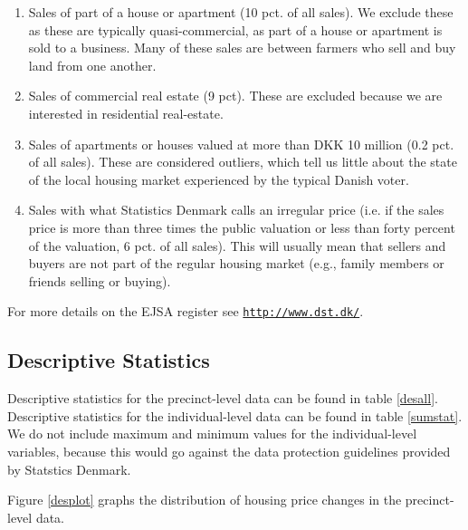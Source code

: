 \documentclass[12pt,a4paper]{article}
\begin{document}
	\begin{enumerate}
		\item Sales of part of a house or apartment (10 pct. of all sales). We exclude these as these are typically quasi-commercial, as part of a house or apartment is sold to a business. Many of these sales are between farmers who sell and buy land from one another.
		\item Sales of commercial real estate (9 pct). These are excluded because we are interested in residential real-estate.
		\item Sales of apartments or houses valued at more than DKK 10 million (0.2 pct. of all sales). These are considered outliers, which tell us little about the state of the local housing market experienced by the typical Danish voter.
		\item Sales with what Statistics Denmark calls an irregular price (i.e. if the sales price is more than three times the public valuation or less than forty percent of the valuation, 6 pct. of all sales). This will usually mean that sellers and buyers are not part of the regular housing market (e.g., family members or friends selling or buying).
	\end{enumerate}
	
	For more details on the EJSA register see \texttt{\href{http://www.dst.dk/extranet/ForskningVariabellister/EJSA\%20-\%20Ejendomme\%20salgsoplysninger.html}{http://www.dst.dk/}}.
	
	\newpage
	\subsection{Descriptive Statistics} \label{sumstats}
	\setcounter{table}{0}
	
	Descriptive statistics for the precinct-level data can be found in table \ref{desall}. Descriptive statistics for the individual-level data can be found in table \ref{sumstat}. We do not include maximum and minimum values for the individual-level variables, because this would go against the data protection guidelines provided by Statstics Denmark.
	
	Figure \ref{desplot} graphs the distribution of housing price changes in the precinct-level data. 
	
	
	
	
\end{document}
